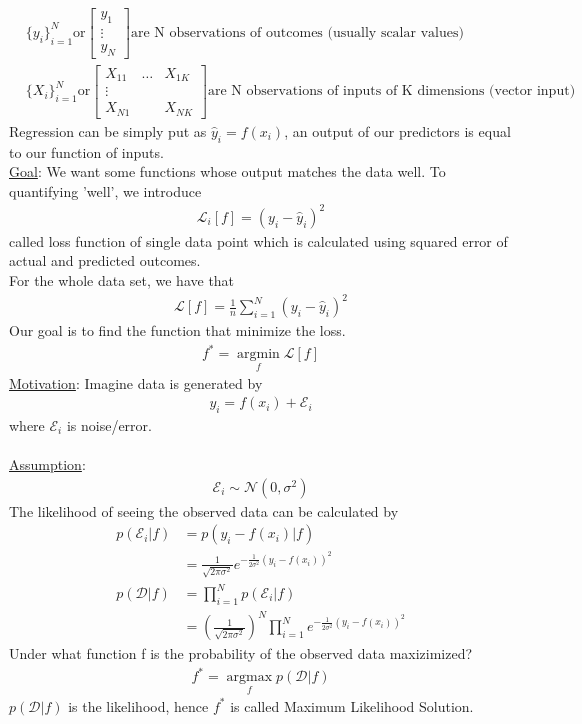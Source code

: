 \begin{align*}
&{\big\{y_i \big\}}_{i=1}^N \text{or} 
 \begin{bmatrix} 
    y_{1} \\
    \vdots \\
    y_{N} 
\end{bmatrix}  \text{are N observations of outcomes (usually scalar values) } \\
&{\big\{X_i \big\}}_{i=1}^N  \text{or} 
\begin{bmatrix} 
    X_{11} & \dots & X_{1K} \\
    \vdots \\
    X_{N1} &        & X_{NK} 
    \end{bmatrix} \text{are N observations of inputs of K dimensions (vector input) }
\end{align*}
\noindent
Regression can be simply put as $\hat{y}_i = f(x_i)$, an output of our predictors is equal to our function of inputs.\\
\underline{Goal}: We want some functions whose output matches the data well. To quantifying 'well', we introduce
\begin{align*}
\mathcal{L}_{i}[f] = (y_i - \hat{y}_i)^2
\end{align*}
called loss function of single data point which is calculated using squared error of actual and predicted outcomes.\\
For the whole data set, we have that
\begin{align*}
\mathcal{L}[f] = \frac{1}{n}\sum_{i=1}^{N}(y_i - \hat{y}_i)^2
\end{align*}
Our goal is to find the function that minimize the loss.
\begin{align*}
f^{*} = \operatorname*{argmin}_f \mathcal{L}[f]
\end{align*}
\noindent
\underline{Motivation}: Imagine data is generated by
\begin{align*}
y_i = f(x_i) + \mathcal{E}_i
\end{align*}
where $\mathcal{E}_i $  is noise/error.\\
\\
\underline{Assumption}: 
\begin{align*}
\mathcal{E}_i \sim \mathcal{N}(0, \sigma^2)
\end{align*}
\noindent
The likelihood of seeing the observed data can be calculated by
\begin{align*}
p(\mathcal{E}_i | f) &= p(y_i - f(x_i) | f)\\
&= \frac{1}{\sqrt{2\pi\sigma^2}}e^{-\frac{1}{2\sigma^2}(y_i - f(x_i))^2} \\
p(\mathcal{D}|f) &=  \prod_{i=1}^{N}p(\mathcal{E}_i | f)\\
&= (\frac{1}{\sqrt{2\pi\sigma^2}})^N \prod_{i=1}^{N}e^{-\frac{1}{2\sigma^2}(y_i - f(x_i))^2} 
\end{align*}
Under what function f is the probability of the observed data maxizimized?
\begin{align*}
f^{*} = \operatorname*{argmax}_f p(\mathcal{D}|f) 
\end{align*}
$p(\mathcal{D}|f)$ is the likelihood, hence $f^{*}$ is called Maximum Likelihood Solution.\\

